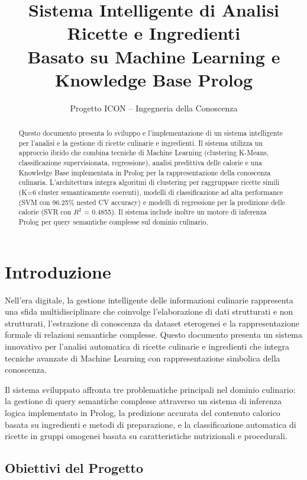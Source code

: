 \documentclass[12pt,a4paper]{article}
\title{\textbf{Sistema Intelligente di Analisi Ricette e Ingredienti} \\
       \large Basato su Machine Learning e Knowledge Base Prolog}
\author{Progetto ICON -- Ingegneria della Conoscenza}
\begin{document}
\maketitle
\begin{abstract}
Questo documento presenta lo sviluppo e l'implementazione di un sistema intelligente per l'analisi e la gestione di ricette culinarie e ingredienti. Il sistema utilizza un approccio ibrido che combina tecniche di Machine Learning (clustering K-Means, classificazione supervisionata, regressione), analisi predittiva delle calorie e una Knowledge Base implementata in Prolog per la rappresentazione della conoscenza culinaria. L'architettura integra algoritmi di clustering per raggruppare ricette simili (K=6 cluster semanticamente coerenti), modelli di classificazione ad alta performance (SVM con 96.25\% nested CV accuracy) e modelli di regressione per la predizione delle calorie (SVR con $R^2$ = 0.4855). Il sistema include inoltre un motore di inferenza Prolog per query semantiche complesse sul dominio culinario.
\end{abstract}

\tableofcontents
\newpage

\section{Introduzione}

Nell'era digitale, la gestione intelligente delle informazioni culinarie rappresenta una sfida multidisciplinare che coinvolge l'elaborazione di dati strutturati e non strutturati, l'estrazione di conoscenza da dataset eterogenei e la rappresentazione formale di relazioni semantiche complesse. Questo documento presenta un sistema innovativo per l'analisi automatica di ricette culinarie e ingredienti che integra tecniche avanzate di Machine Learning con rappresentazione simbolica della conoscenza.

Il sistema sviluppato affronta tre problematiche principali nel dominio culinario: la gestione di query semantiche complesse attraverso un sistema di inferenza logica implementato in Prolog, la predizione accurata del contenuto calorico basata su ingredienti e metodi di preparazione, e la classificazione automatica di ricette in gruppi omogenei basata su caratteristiche nutrizionali e procedurali.

\subsection{Obiettivi del Progetto}
\end{document}
